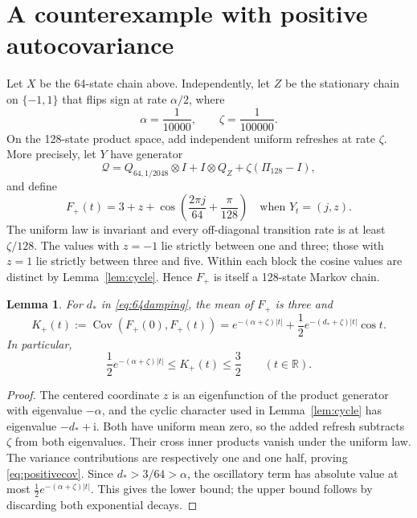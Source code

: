\documentclass[10pt,a4paper]{amsart}
\numberwithin{equation}{section}
\newtheorem{lemma}[theorem]{Lemma}
\newcommand{\R}{\mathbb R}
\newcommand{\1}{\mathbf 1}
\newcommand{\ii}{\mathrm i}
\DeclareMathOperator{\Cov}{Cov}
\begin{document}
\section{A counterexample with positive autocovariance}\label{sec:positive}
Let $X$ be the 64-state chain above. Independently, let $Z$ be the stationary chain on $\{-1,1\}$ that flips sign at rate $\alpha/2$, where
\begin{equation}\label{eq:positiverates}
 \alpha=\frac1{10000},\qquad \zeta=\frac1{100000}.
\end{equation}
On the 128-state product space, add independent uniform refreshes at rate $\zeta$. More precisely, let $Y$ have generator
\begin{equation}\label{eq:positivegenerator}
 \mathcal Q=Q_{64,1/2048}\otimes I+I\otimes Q_Z
                  +\zeta(\Pi_{128}-I),
\end{equation}
and define
\begin{equation}\label{eq:positiveF}
 F_+(t)=3+z+\cos\left(\frac{2\pi j}{64}+\frac\pi{128}\right)
 \quad\text{when }Y_t=(j,z).
\end{equation}
The uniform law is invariant and every off-diagonal transition rate is at least $\zeta/128$. The values with $z=-1$ lie strictly between one and three; those with $z=1$ lie strictly between three and five. Within each block the cosine values are distinct by Lemma~\ref{lem:cycle}. Hence $F_+$ is itself a 128-state Markov chain.

\begin{lemma}\label{lem:positivecov}
For $d_*$ in \eqref{eq:64damping}, the mean of $F_+$ is three and
\begin{equation}\label{eq:positivecov}
 K_+(t):=\Cov(F_+(0),F_+(t))
 =e^{-(\alpha+\zeta)|t|}
       +\frac12e^{-(d_*+\zeta)|t|}\cos t.
\end{equation}
In particular,
\begin{equation}\label{eq:positivecovbound}
 \frac12e^{-(\alpha+\zeta)|t|}\le K_+(t)\le\frac32
 \qquad(t\in\R).
\end{equation}
\end{lemma}
\begin{proof}
The centered coordinate $z$ is an eigenfunction of the product generator with eigenvalue $-\alpha$, and the cyclic character used in Lemma~\ref{lem:cycle} has eigenvalue $-d_*+\ii$. Both have uniform mean zero, so the added refresh subtracts $\zeta$ from both eigenvalues. Their cross inner products vanish under the uniform law. The variance contributions are respectively one and one half, proving \eqref{eq:positivecov}. Since $d_*>3/64>\alpha$, the oscillatory term has absolute value at most $\tfrac12e^{-(\alpha+\zeta)|t|}$. This gives the lower bound; the upper bound follows by discarding both exponential decays.
\end{proof}
\end{document}
